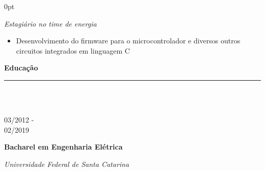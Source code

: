 \documentclass[a4paper]{article}
\begin{document}
\begin{adjustwidth}{\parindent}{0pt}
\begin{minipage}[t]{0.65\textwidth}
\begin{minipage}[t]{0.8\textwidth}
{  \large{\textit{Estagiário no time de energia}}
}
\begin{itemize}
  \item \normalsize{Desenvolvimento do firmware para o microcontrolador e diversos outros circuitos integrados em linguagem C}
\end{itemize}
  
\end{minipage}

\Large{\textbf{Educação}} \normalsize \\ \rule{\textwidth}{0.5pt} \\ \\
\begin{minipage}[t]{0.2\textwidth}
\large{03/2012 - \\ 02/2019}
\end{minipage}
\begin{minipage}[t]{0.8\textwidth}
{
  \setlength{\parskip}{5.5pt}
  \Large{\textbf{Bacharel em Engenharia Elétrica}}
  
  \large{\textit{Universidade Federal de Santa Catarina}} \\
}
\end{minipage} \\ \\


\end{minipage}
\end{adjustwidth}
\end{document}

